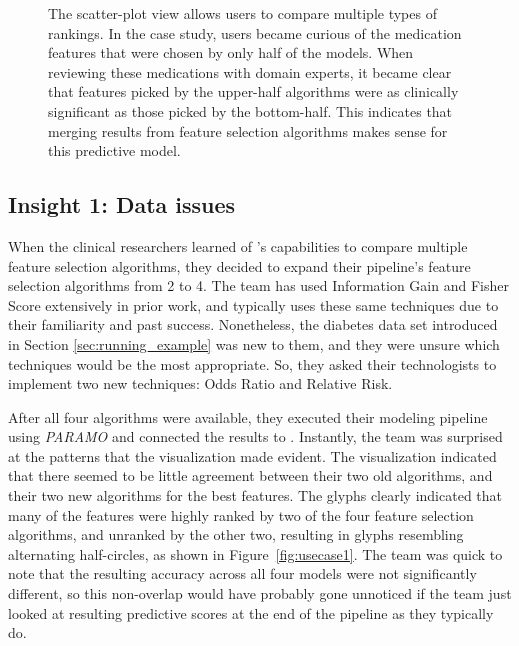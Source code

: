 \begin{figure}[ht]
{\begin{tikzpicture}
\end{tikzpicture}%
}
\caption[The scatter-plot view allows users to compare multiple types of rankings.]{
The scatter-plot view allows users to compare multiple types of rankings.  In the case study, users became curious of the medication features that were chosen by only half of the models.  When reviewing these medications with domain experts, it became clear that features picked by the upper-half algorithms were as clinically significant as those picked by the bottom-half.  This indicates that merging results from feature selection algorithms makes sense for this predictive model.
}
\label{fig:usecase2}
\end{figure}

\subsection{Insight 1: Data issues}
When the clinical researchers learned of \infuse's capabilities
to compare multiple feature selection algorithms, they decided to
expand their pipeline's feature selection algorithms from 2 to 4.
The team has used Information Gain and Fisher Score extensively
in prior work, and typically uses these same techniques due
to their familiarity and past success.
Nonetheless, the diabetes data set introduced in Section \ref{sec:running_example} was new to them, and they were unsure which techniques would be the most appropriate. So, they asked their technologists to implement two new techniques: Odds Ratio and Relative Risk.

After all four algorithms were available, they executed their modeling pipeline
using \textit{PARAMO} \cite{paramo} and connected the results to \infuse.
Instantly, the team was surprised at the patterns that the visualization made evident.
The visualization indicated that there seemed to be little agreement between their two
old algorithms, and their two new algorithms for the best features.
The glyphs clearly indicated that many of the features were
highly ranked by two of the four feature selection algorithms,
and unranked by the other two, resulting in glyphs resembling alternating half-circles,
as shown in Figure~\ref{fig:usecase1}.
The team was quick to note that the resulting accuracy across
all four models were not significantly different,
so this non-overlap would have probably gone unnoticed if the
team just looked at resulting predictive scores at the
end of the pipeline as they typically do.

